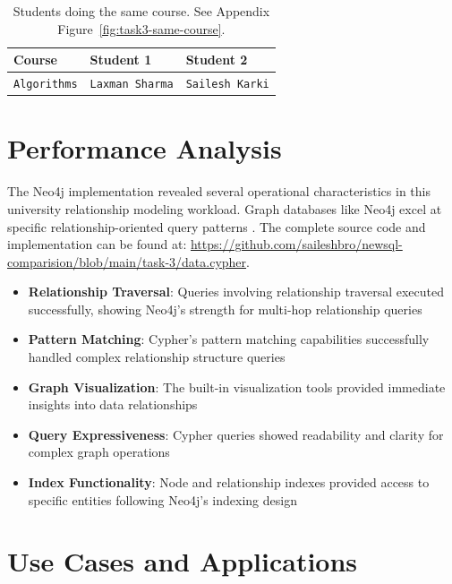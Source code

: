 \begin{table}[H]
  \centering
  \caption{Students doing the same course. See Appendix Figure~\ref{fig:task3-same-course}.}
  \begin{tabular}{|l|l|l|}
    \hline
    \textbf{Course} & \textbf{Student 1} & \textbf{Student 2} \\
    \hline
    \texttt{Algorithms} & \texttt{Laxman Sharma} & \texttt{Sailesh Karki} \\
    \hline
  \end{tabular}
\end{table}

\section{Performance Analysis}

The Neo4j implementation revealed several operational characteristics in this university relationship modeling workload. Graph databases like Neo4j excel at specific relationship-oriented query patterns \parencite{neo4j_manual}. The complete source code and implementation can be found at: \url{https://github.com/saileshbro/newsql-comparision/blob/main/task-3/data.cypher}.

\begin{itemize}
    \item \textbf{Relationship Traversal}: Queries involving relationship traversal executed successfully, showing Neo4j's strength for multi-hop relationship queries \parencite{neo4j_survey}
    \item \textbf{Pattern Matching}: Cypher's pattern matching capabilities successfully handled complex relationship structure queries \parencite{cypher_query_language}
    \item \textbf{Graph Visualization}: The built-in visualization tools provided immediate insights into data relationships \parencite{graph_visualization}
    \item \textbf{Query Expressiveness}: Cypher queries showed readability and clarity for complex graph operations \parencite{cypher_query_language}
    \item \textbf{Index Functionality}: Node and relationship indexes provided access to specific entities following Neo4j's indexing design \parencite{neo4j_manual}
\end{itemize}

\section{Use Cases and Applications}

